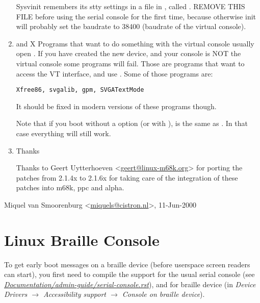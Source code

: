\documentclass[a4paper,8pt,english]{sphinxmanual}
\begin{document}
\begin{enumerate}
Sysvinit remembers its stty settings in a file in , called
. REMOVE THIS FILE before using the serial
console for the first time, because otherwise init will probably
set the baudrate to 38400 (baudrate of the virtual console).

\item {} 
 and X
Programs that want to do something with the virtual console usually
open . If you have created the new  device,
and your console is NOT the virtual console some programs will fail.
Those are programs that want to access the VT interface, and use
. Some of those programs are:

\begin{Verbatim}[commandchars=\\\{\}]
Xfree86, svgalib, gpm, SVGATextMode
\end{Verbatim}

It should be fixed in modern versions of these programs though.

Note that if you boot without a  option (or with
),  is the same as .
In that case everything will still work.

\item {} 
Thanks

Thanks to Geert Uytterhoeven \textless{}\href{mailto:geert@linux-m68k.org}{geert@linux-m68k.org}\textgreater{}
for porting the patches from 2.1.4x to 2.1.6x for taking care of
the integration of these patches into m68k, ppc and alpha.

\end{enumerate}

Miquel van Smoorenburg \textless{}\href{mailto:miquels@cistron.nl}{miquels@cistron.nl}\textgreater{}, 11-Jun-2000


\chapter{Linux Braille Console}
\label{admin-guide/braille-console:linux-braille-console}\label{admin-guide/braille-console::doc}
To get early boot messages on a braille device (before userspace screen
readers can start), you first need to compile the support for the usual serial
console (see {\hyperref[admin\string-guide/serial\string-console:serial\string-console]{\emph{Documentation/admin-guide/serial-console.rst}}}), and
for braille device
(in \emph{Device Drivers \(\rightarrow\) Accessibility support \(\rightarrow\) Console on braille device}).
\end{document}
